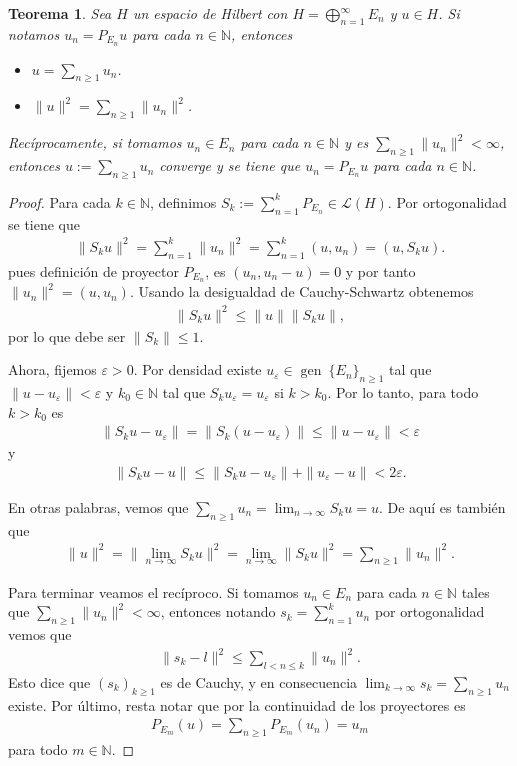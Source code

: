 \documentclass[11pt]{report}
\theoremstyle{colored}
\newtheorem{theorem}{Teorema}[section]
\newcommand{\N}{\mathbb{N}}
\newcommand{\eps}{\varepsilon}
\newcommand{\ip}[1]{( #1 )}
\begin{document}
\begin{theorem} Sea $H$ un espacio de Hilbert con $H = \bigoplus_{n = 1}^\infty E_n$ y $u \in H$. Si notamos $u_n = P_{E_n}u$ para cada $n \in \N$, entonces
\begin{itemize}
\item[(i)] $u = \sum_{n \geq 1}u_n$.
\item[(ii)] $\|u\|^2 = \sum_{n \geq 1}\|u_n\|^2$.
\end{itemize}

Recíprocamente, si tomamos $u_n \in E_n$ para cada $n \in \N$ y es $\sum_{n \geq 1}\|u_n\|^2 < \infty$, entonces $u := \sum_{n \geq 1}u_n$ converge y se tiene que $u_n = P_{E_n}u$ para cada $n \in \N$.
\end{theorem}
\begin{proof} Para cada $k \in \N$, definimos $S_k := \sum_{n=1}^k P_{E_n} \in \mathscr{L}(H)$. Por ortogonalidad se tiene que
\begin{align*}
\|S_ku\|^2 = \sum_{n=1}^k\|u_n\|^2 = \sum_{n=1}^k(u,u_n) = (u,S_ku).
\end{align*}
pues definición de proyector $P_{E_n}$, es $(u_n,u_n-u) = 0$ y por tanto $\|u_n\|^2 = \ip{u,u_n}$. Usando la desigualdad de Cauchy-Schwartz obtenemos
\begin{align*}
\|S_ku\|^2 \leq \|u\|\|S_ku\|,
\end{align*}
por lo que debe ser $\|S_k\| \leq 1$.

Ahora, fijemos $\eps > 0$. Por densidad existe $u_\eps \in \operatorname{gen}\ \{E_n\}_{n \geq 1}$ tal que $\|u-u_\eps\|< \eps$ y $k_0 \in \N$ tal que $S_ku_\eps = u_\eps$ si $k > k_0$. Por lo tanto, para todo $k > k_0$ es
\begin{align*}
\|S_ku-u_\eps\| = \|S_k(u-u_\eps)\| \leq \|u-u_\eps\| < \eps 
\end{align*}
y
\begin{align*}
\|S_ku-u\| \leq \|S_ku-u_\eps\| + \|u_\eps - u\| < 2\eps.
\end{align*}

En otras palabras, vemos que $\sum_{n \geq 1}u_n = \lim_{n \to \infty} S_ku = u$. De aquí es también que
\begin{align*}
\|u\|^2 = \|\lim_{n \to \infty}S_ku\|^2 = \lim_{n \to \infty}\|S_ku\|^2 = \sum_{n \geq 1}\|u_n\|^2.
\end{align*}

Para terminar veamos el recíproco. Si tomamos $u_n \in E_n$ para cada $n \in \N$ tales que $\sum_{n \geq 1}\|u_n\|^2 < \infty$, entonces notando $s_k = \sum_{n=1}^ku_n$ por ortogonalidad vemos que
\begin{align*}
\|s_k-l\|^2 \leq \sum_{l < n \leq k}\|u_n\|^2.
\end{align*}
Esto dice que $(s_k)_{k \geq 1}$ es de Cauchy, y en consecuencia $\lim_{k \to \infty}s_k = \sum_{n \geq 1}u_n$ existe. Por último, resta notar que por la continuidad de los proyectores es
\begin{align*}
P_{E_m}(u) = \sum_{n \geq 1}P_{E_m}(u_n) = u_m
\end{align*} 
para todo $m \in \N$.
\end{proof}
\end{document}
